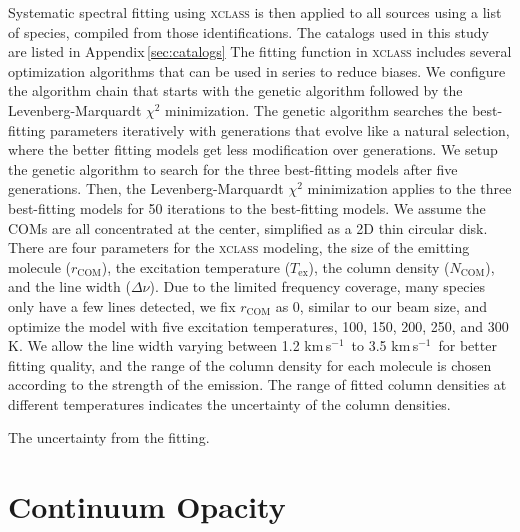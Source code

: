 \documentclass[twocolumn]{aastex62}
\newcommand{\kms}{\mbox{\,km\,s$^{-1}$}}
\begin{document}
Systematic spectral fitting using \textsc{xclass} is then applied to all sources using a list of species, compiled from those identifications.  The catalogs used in this study are listed in Appendix\,\ref{sec:catalogs}  The fitting function in \textsc{xclass} includes several optimization algorithms that can be used in series to reduce biases.  We configure the algorithm chain that starts with the genetic algorithm followed by the Levenberg-Marquardt $\chi^{2}$ minimization.  The genetic algorithm searches the best-fitting parameters iteratively with generations that evolve like a natural selection, where the better fitting models get less modification over generations.  We setup the genetic algorithm to search for the three best-fitting models after five generations.  Then, the Levenberg-Marquardt $\chi^{2}$ minimization applies to the three best-fitting models for 50 iterations to the best-fitting models.  We assume the COMs are all concentrated at the center, simplified as a 2D thin circular disk.  There are four parameters for the \textsc{xclass} modeling, the size of the emitting molecule ($r_\text{COM}$), the excitation temperature ($T_\text{ex}$), the column density ($N_\text{COM}$), and the line width ($\Delta \nu$).  Due to the limited frequency coverage, many species only have a few lines detected, we fix $r_\text{COM}$ as 0, similar to our beam size, and optimize the model with five excitation temperatures, 100, 150, 200, 250, and 300 K.  We allow the line width varying between 1.2\,\kms\ to 3.5\,\kms\ for better fitting quality, and the range of the column density for each molecule is chosen according to the strength of the emission.  The range of fitted column densities at different temperatures indicates the uncertainty of the column densities.

The uncertainty from the fitting.

\newpage


\section{Continuum Opacity}
\end{document}
